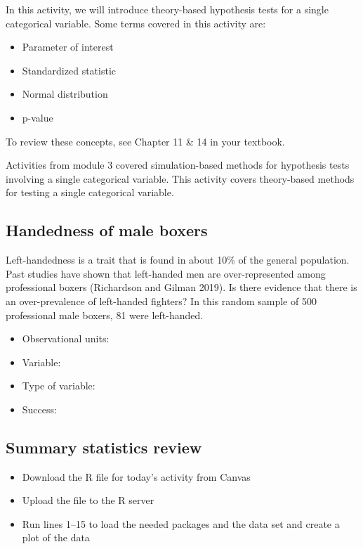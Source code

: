 \documentclass[
]{report}
\begin{document}
In this activity, we will introduce theory-based hypothesis tests for a single categorical variable. Some terms covered in this activity are:

\begin{itemize}
\item
  Parameter of interest
\item
  Standardized statistic
\item
  Normal distribution
\item
  p-value
\end{itemize}

To review these concepts, see Chapter 11 \& 14 in your textbook.

Activities from module 3 covered simulation-based methods for hypothesis tests involving a single categorical variable. This activity covers theory-based methods for testing a single categorical variable.

\subsection{Handedness of male boxers}\label{handedness-of-male-boxers}

Left-handedness is a trait that is found in about 10\% of the general population. Past studies have shown that left-handed men are over-represented among professional boxers (Richardson and Gilman 2019). Is there evidence that there is an over-prevalence of left-handed fighters? In this random sample of 500 professional male boxers, 81 were left-handed.

\begin{itemize}
\item
  Observational units:
\item
  Variable:
\item
  Type of variable:
\item
  Success:
\end{itemize}

\subsection{Summary statistics review}\label{summary-statistics-review}

\begin{itemize}
\item
  Download the R file for today's activity from Canvas
\item
  Upload the file to the R server
\item
  Run lines 1--15 to load the needed packages and the data set and create a plot of the data
\end{itemize}
\end{document}
